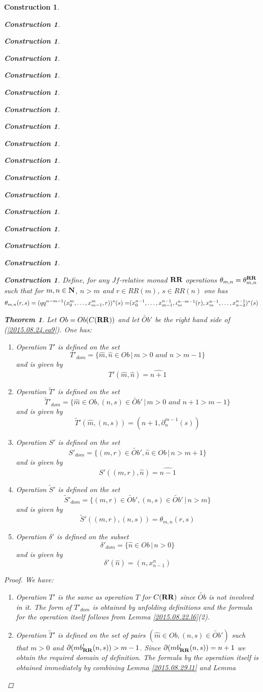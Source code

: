 \documentclass[12pt]{amsart}
\newenvironment{eq}{\begin{equation}}{\end{equation}}
\newtheorem{theorem}[proposition]{Theorem}
\newtheorem{construction}[proposition]{Construction}
\newcommand{\llabel}[1]{\label{#1}}
\newcommand{\nn}{{\bf N\rm}}
\newcommand{\nat}{\nn}
\newcommand{\wt}{\widetilde}
\newcommand{\wh}{\widehat}
\newcommand{\mbind}[1]{{#1^*}}
\newcommand{\RR}{{\bf RR}}
\begin{document}
\begin{construction}
\begin{construction}
\begin{construction}
\begin{construction}
\begin{construction}
\begin{construction}
\begin{construction}
\begin{construction}
\begin{construction}
\begin{construction}
\begin{construction}
\begin{construction}
\begin{construction}
\begin{construction}
\begin{construction}
\begin{construction}
\begin{construction}
Define, for any $Jf$-relative monad $\RR$ operations
$\theta_{m,n}=\theta^{\RR}_{m,n}$ such that for $m,n\in\nat$, $n>m$ and $r\in
RR(m)$, $s\in RR(n)$ one has
%
\begin{eq}
\llabel{2015.09.07.eq1}
\theta_{m,n}(r,s)=\mbind{(qq^{n-m-1}(x_0^m,\dots,x_{m-1}^m,r))}(s)=$$
$$\mbind{(x_0^{n-1},\dots,x_{m-1}^{n-1},\iota_{m}^{n-m-1}(r),x_m^{n-1},\dots,x_{n-2}^{n-1})}(s)
\end{eq}%
%
\begin{theorem}
\llabel{2015.08.26.th1}
Let $Ob=Ob(C(\RR))$ and let $\wt{Ob}'$ be the right hand side of (\ref{2015.08.24.eq9}). One has:
%
\begin{enumerate}
\item Operation $T'$ is defined on the set
%
$$T'_{dom}=\{\wh{m},\wh{n}\in Ob\,|\,m>0\,\,and\,\,n>m-1\}$$
%
and is given by 
%
$$T'(\wh{m},\wh{n})=\wh{n+1}$$
%
\item Operation $\wt{T}'$ is defined on the set 
%
$$\wt{T}'_{dom}=\{\wh{m}\in Ob, (n,s)\in \wt{Ob}'\,|\,m>0\,\,and\,\,n+1>m-1\}$$
%
and is given by
%
$$\wt{T}'(\wh{m},(n,s))=(n+1,\partial_n^{m-1}(s))$$
%
\item Operation $S'$ is defined on the set
%
$$S'_{dom}=\{(m,r)\in \wt{Ob}',\wh{n}\in Ob\,|\,n>m+1\}$$
%
and is given by
%
$$S'((m,r),\wh{n})=\wh{n-1}$$
%
\item Operation $\wt{S}'$ is defined on the set 
%
$$\wt{S}'_{dom}=\{(m,r)\in\wt{Ob}',(n,s)\in \wt{Ob}'\,|\,n>m\}$$
%
and is given by
%
$$\wt{S}'((m,r),(n,s))=\theta_{m,n}(r,s)$$
%
\item Operation $\delta'$ is defined on the subset
%
$$\delta'_{dom}=\{\wh{n}\in Ob\,|\,n>0\}$$
%
and is given by
%
$$\delta'(\wh{n})=(n,x_{n-1}^n)$$
%
\end{enumerate}
\end{theorem}
%
\begin{proof}
We have:
%
\begin{enumerate}
%
\item Operation $T'$ is the same as operation $T$ for $C(\RR)$ since $\wt{Ob}$
  is not involved in it. The form of $T'_{dom}$ is obtained by unfolding
  definitions and the formula for the operation itself follows from Lemma
  \ref{2015.08.22.l6}(2).
%
\item Operation $\wt{T}'$ is defined on the set of pairs $(\wh{m}\in Ob,
  (n,s)\in \wt{Ob}')$ such that $m>0$ and
  $\partial(mb_{\RR}^!(n,s))>m-1$. Since $\partial(mb_{\RR}^!(n,s))=n+1$ we
  obtain the required domain of definition. The formula by the operation itself
  is obtained immediately by combining Lemma \ref{2015.08.29.l1} and Lemma

\end{enumerate}
\end{proof}
\end{construction}
\end{construction}
\end{construction}
\end{construction}
\end{construction}
\end{construction}
\end{construction}
\end{construction}
\end{construction}
\end{construction}
\end{construction}
\end{construction}
\end{construction}
\end{construction}
\end{construction}
\end{construction}
\end{construction}
\end{document}
